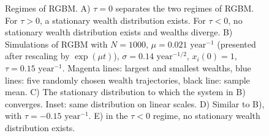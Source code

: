 \begin{figure}[!htb]
\caption{Regimes of RGBM. A) $\tau=0$ separates the two regimes of RGBM. For $\tau>0$, a stationary wealth distribution exists. For $\tau<0$, no stationary wealth distribution exists and wealths diverge. B) Simulations of RGBM with $N=1000$, $\mu=0.021 \text{ year}^{-1}$ (presented after rescaling by $\exp(\mu t)$), $\sigma=0.14\text{ year}^{-1/2}$, $x_i\left(0\right)=1$, $\tau=0.15 \text{ year}^{-1}$. Magenta lines: largest and smallest wealths, blue lines: five randomly chosen wealth trajectories, black line: sample mean. C) The stationary distribution to which the system in B) converges. Inset: same distribution on linear scales. D) Similar to B), with $\tau=-0.15 \text{ year}^{-1}$. E) in the $\tau<0$ regime, no stationary wealth distribution exists.}
\end{figure}


